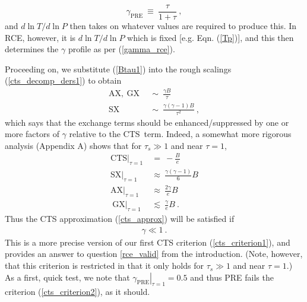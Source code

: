 \documentclass{ametsoc}
\newcommand{\beqn}{\begin{equation}}
\newcommand{\eeqn}{\end{equation}}
\newcommand{\n}{\nonumber}
\newcommand{\eqnref}[1]{(\ref{#1})}
\newcommand{\taus}{\ensuremath{\tau_s}}
\newcommand{\SX}{\ensuremath{\mathrm{SX}}}
\newcommand{\AX}{\ensuremath{\mathrm{AX}}}
\newcommand{\GX}{\ensuremath{\mathrm{GX}}}
\newcommand{\CTS}{\ensuremath{\mathrm{CTS}}}
\begin{document}
\beqn
	\gamma_{\mathrm{PRE}} \  \equiv \ \frac{\tau}{1+\tau} \ ,
	\n
\eeqn
 and $d \ln T/ d\ln P$ then takes on whatever values are required to produce this. In RCE, however, it is $d \ln T/ d\ln P$ which is fixed [e.g. Eqn. \eqnref{Tp}], and this then determines the $\gamma$ profile as per \eqnref{gamma_rce}.

Proceeding on, we substitute \eqnref{Btau1} into the rough scalings \eqnref{cts_decomp_ders1} to obtain 
\begin{subequations}
	\begin{align}
		\AX, \ \GX	 \ & \ \sim \ \frac{\gamma B}{\tau}  \label{ax_gx_scaling}\\
		\SX	 \ & \ \sim \ \frac{\gamma(\gamma-1)B}{\tau^2}  \ , \label{sx_scaling} 
	\end{align}
	\label{cts_decomp_ders2}
\end{subequations}
which says that the exchange terms should be enhanced/suppressed by one or more factors of $\gamma$ relative to the \CTS\ term. Indeed, a somewhat more rigorous analysis (Appendix A) shows that for $\taus \gg1 $ and near $\tau=1$,
\beqn
	\begin{split}
	 	\CTS|_{\tau=1} & \ = \  - \frac{B}{e}   \\
 		\SX|_{\tau=1} &\ \approx   \ \frac{\gamma(\gamma-1) }{6} B  \\
 		\AX|_{\tau=1} & \ \approx  \   \frac{2\gamma }{ e} B   \\
\		\GX|_{\tau=1} & \ \lesssim  \  \frac{\gamma }{ e } B   \ .
\end{split}
\label{cts_decomp_tau1}
\eeqn
Thus the CTS approximation \eqnref{cts_approx}  will be satisfied if 
\begin{align}
	 \gamma  \ll 1 \ . 
	\label{cts_criterion2}
\end{align}
This is a more precise version of our first CTS criterion \eqnref{cts_criterion1}, and provides an answer to question \ref{rce_valid} from the introduction. (Note, however, that this criterion is restricted in that it only holds for $\taus\gg 1$ and near $\tau=1$.)  As a first, quick test, we note that  $\left. \gamma_{\mathrm{PRE}}\right|_{\tau=1} =  0.5$ and thus PRE fails the criterion \eqnref{cts_criterion2}, as it should.

\end{document}
